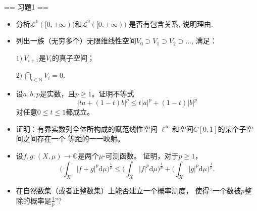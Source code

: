 \begin{center}
\end{center}

== 习题1 ==

\begin{itemize}
	\item[1]分析$\mathcal{L}^1([0,+\infty))$和$\mathcal{L}^2([0,+\infty))$
    是否有包含关系, 说明理由.

	\item[2]列出一族（无穷多个）无限维线性空间$V_0\supset V_1 \supset V_2 \supset \dots$, 满足：\par
	$ 1)\ V_{i+1}$是$V_i$的真子空间；

	$ 2)\ \displaystyle \bigcap_{i\in \mathbb{N}}V_i = {0}$.
    \item[3]设$a, b, p$是实数，且$p\geqslant 1$。证明不等式
	$$|ta+(1-t)b|^p \leqslant t|a|^p+(1-t)|b|^p$$
	对任意$0 \leqslant t \leqslant 1$都成立。
    \item[4]证明：有界实数列全体所构成的赋范线性空间
    $\ell^{\infty}$和空间$C[0,1]$的某个子空间之间存在一个
    等距的一一映射。
    \item[5]设$f,g:(X,\mu)\rightarrow \mathbb{C}$是两个$\mu$-可测函数。
    证明，对于$p \geqslant 1$，
	$$\bigg(\int_{X}|f+g|^p\mathrm{d}\mu\bigg)^{\frac{1}{p}}
    \leqslant \bigg(\int_{X}|f|^p\mathrm{d}\mu\bigg)^{\frac{1}{p}} + 
    \bigg(\int_{X}|g|^p\mathrm{d}\mu\bigg)^{\frac{1}{p}}.$$
    \item[6$^*$]在自然数集（或者正整数集）上能否建立一个概率测度，
    使得``一个数被$p$整除的概率是$\displaystyle \frac{1}{p}$''?
\end{itemize}

